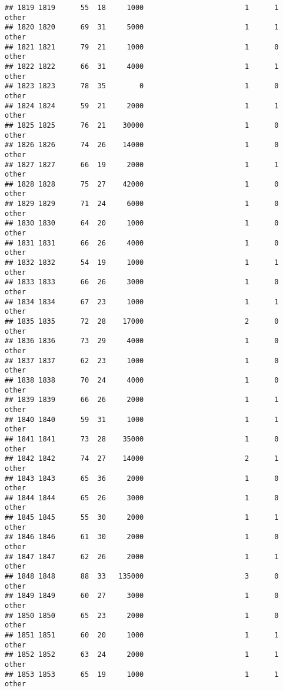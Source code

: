 \documentclass[
]{article}
\begin{document}
\begin{verbatim}
## 1819 1819      55  18     1000                        1      1    other
## 1820 1820      69  31     5000                        1      1    other
## 1821 1821      79  21     1000                        1      0    other
## 1822 1822      66  31     4000                        1      1    other
## 1823 1823      78  35        0                        1      0    other
## 1824 1824      59  21     2000                        1      1    other
## 1825 1825      76  21    30000                        1      0    other
## 1826 1826      74  26    14000                        1      0    other
## 1827 1827      66  19     2000                        1      1    other
## 1828 1828      75  27    42000                        1      0    other
## 1829 1829      71  24     6000                        1      0    other
## 1830 1830      64  20     1000                        1      0    other
## 1831 1831      66  26     4000                        1      0    other
## 1832 1832      54  19     1000                        1      1    other
## 1833 1833      66  26     3000                        1      0    other
## 1834 1834      67  23     1000                        1      1    other
## 1835 1835      72  28    17000                        2      0    other
## 1836 1836      73  29     4000                        1      0    other
## 1837 1837      62  23     1000                        1      0    other
## 1838 1838      70  24     4000                        1      0    other
## 1839 1839      66  26     2000                        1      1    other
## 1840 1840      59  31     1000                        1      1    other
## 1841 1841      73  28    35000                        1      0    other
## 1842 1842      74  27    14000                        2      1    other
## 1843 1843      65  36     2000                        1      0    other
## 1844 1844      65  26     3000                        1      0    other
## 1845 1845      55  30     2000                        1      1    other
## 1846 1846      61  30     2000                        1      0    other
## 1847 1847      62  26     2000                        1      1    other
## 1848 1848      88  33   135000                        3      0    other
## 1849 1849      60  27     3000                        1      0    other
## 1850 1850      65  23     2000                        1      0    other
## 1851 1851      60  20     1000                        1      1    other
## 1852 1852      63  24     2000                        1      1    other
## 1853 1853      65  19     1000                        1      1    other

\end{verbatim}
\end{document}
